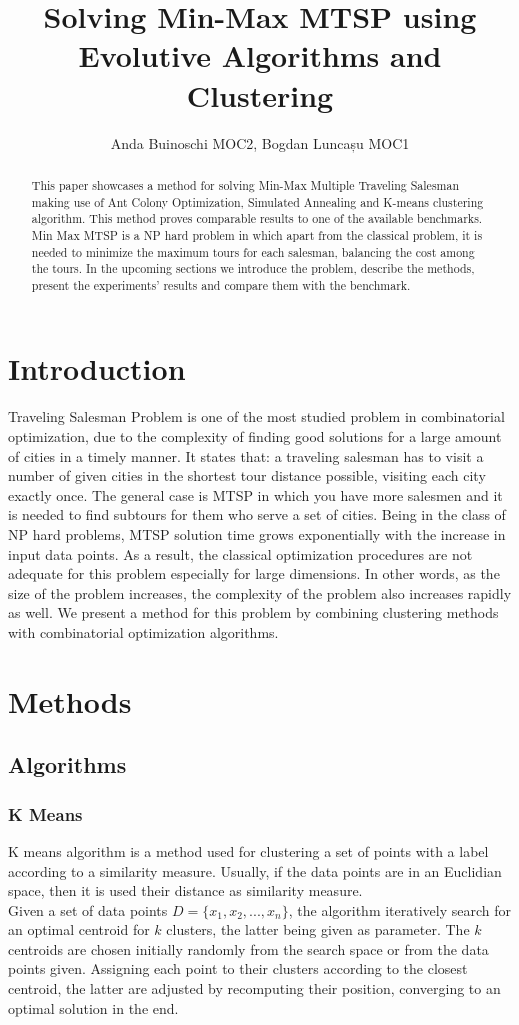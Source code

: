 \documentclass{article}
\title{Solving Min-Max MTSP using Evolutive Algorithms and Clustering}
\author{Anda Buinoschi MOC2, Bogdan Luncașu MOC1 }
\date{}
\begin{document}
\maketitle

\begin{abstract}
This paper showcases a method for solving Min-Max Multiple Traveling Salesman making use of Ant Colony Optimization, Simulated Annealing and K-means clustering algorithm. This method proves comparable results to one of the available benchmarks. Min Max MTSP is a NP hard problem in which apart from the classical problem, it is needed to minimize the maximum tours for each salesman, balancing the cost among the tours. In the upcoming sections we introduce the problem, describe the methods, present the experiments' results and compare them with the benchmark.
\end{abstract}

\section{Introduction}
Traveling Salesman Problem is one of the most studied problem in combinatorial optimization, due to the complexity of finding good solutions for a large amount of cities in a timely manner. It states that: a traveling salesman has to visit a number of given cities in the shortest tour distance possible, visiting each city exactly once. The general case is MTSP in which you have more salesmen and it is needed to find subtours for them who serve a set of cities. Being in the class of NP hard problems, MTSP solution time grows exponentially with the increase in input data points. As a result, the classical optimization procedures are not adequate for this problem especially for large dimensions. In other words, as the size of the problem increases, the complexity of the problem also increases rapidly as well. We present a method for this problem by combining clustering methods with combinatorial optimization algorithms.

\section{Methods}
\subsection{Algorithms}
\subsubsection{K Means}
K means algorithm is a method used for clustering a set of points with a label according to a similarity measure. Usually, if the data points are in an Euclidian space, then it is used their distance as similarity measure.\\
Given a set of data points $D=\{x_1, x_2,...,x_n\}$, the algorithm iteratively search for an optimal centroid for $k$ clusters, the latter being given as parameter. The $k$ centroids are chosen initially randomly from the search space or from the data points given. Assigning each point to their clusters according to the closest centroid, the latter are adjusted by recomputing their position, converging to an optimal solution in the end.
\end{document}
